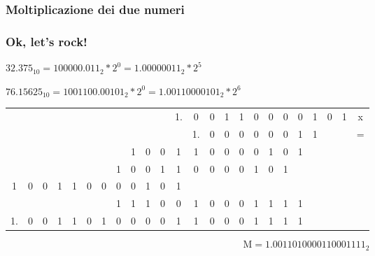 \documentclass{beamer}
\begin{document}
  \subsubsection{Moltiplicazione dei due numeri}
  \begin{frame}
  		\frametitle{Ok, let's rock!}
  	
    $32.375_{10} = 100000.011_{2} * 2^{0} = 1.00000011_{2} * 2^{5}$
    
    $76.15625_{10} = 1001100.00101_{2} * 2^{0} = 1.00110000101_{2} * 2^{6}$
    	
    	\pause
    
    \vspace{1em}
		
		\setlength{\tabcolsep}{2pt}
		\begin{center}
				\begin{tabular}{ccccccccccccccccccccccc|c}
				  &   &   &   &   &   &   &   &   &   &   & 1. & 0 & 0 & 1 & 1 & 0 & 0 & 0 & 0 & 1 & 0 & 1 & x \\ 
				  &   &   &   &   &   &   &   &   &   &   &   & 1. & 0 & 0 & 0 & 0 & 0 & 0 & 1 & 1 &   &   & = \\ 
				\hline 
				  &   &   &   &   &   &   &   & 1 & 0 & 0 & 1 & 1 & 0 & 0 & 0 & 0 & 1 & 0 & 1 &   &   &   &  \\ 
				  &   &   &   &   &   &   & 1 & 0 & 0 & 1 & 1 & 0 & 0 & 0 & 0 & 1 & 0 & 1 &   &   &   &   &  \\ 
				1 & 0 & 0 & 1 & 1 & 0 & 0 & 0 & 0 & 1 & 0 & 1 &   &   &   &   &   &   &   &   &   &   &   &  \\ 
				\hline 
				  &   &   &   &   &   &   & 1 & 1 & 1 & 0 & 0 & 1 & 0 & 0 & 0 & 1 & 1 & 1 & 1 &   &   &   &  \\ 
				\hline 
				1. & 0 & 0 & 1 & 1 & 0 & 1 & 0 & 0 & 0 & 0 & 1 & 1 & 0 & 0 & 0 & 1 & 1 & 1 & 1 &   &   &   &  \\ 
				\end{tabular} 
		\end{center}
		
		\vspace{2em}
    
		$$\text{M} = 1.0011010000110001111_{2}$$
  		
  \end{frame}
\end{document}
